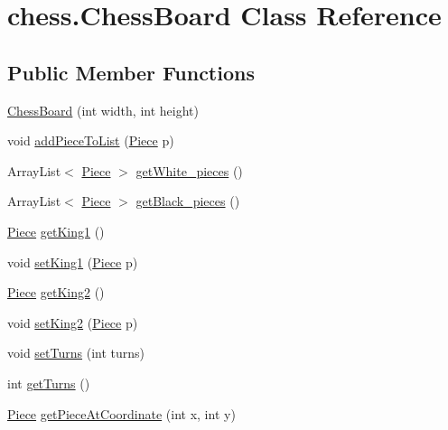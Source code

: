 \hypertarget{classchess_1_1_chess_board}{}\section{chess.\+Chess\+Board Class Reference}
\label{classchess_1_1_chess_board}
\subsection*{Public Member Functions}
\begin{DoxyCompactItemize}
\item 
\hyperlink{classchess_1_1_chess_board_aa5156220e39dfc196616ec027a602901}{Chess\+Board} (int width, int height)
\item 
void \hyperlink{classchess_1_1_chess_board_a10ec830ed5f42a0d269cfd8e7357482b}{add\+Piece\+To\+List} (\hyperlink{classpiece_1_1_piece}{Piece} p)
\item 
Array\+List$<$ \hyperlink{classpiece_1_1_piece}{Piece} $>$ \hyperlink{classchess_1_1_chess_board_a10397175a3ba6a70251604502f62449d}{get\+White\+\_\+pieces} ()
\item 
Array\+List$<$ \hyperlink{classpiece_1_1_piece}{Piece} $>$ \hyperlink{classchess_1_1_chess_board_ac7bc7bbe8fe20fec74bde65be0a85f8b}{get\+Black\+\_\+pieces} ()
\item 
\hyperlink{classpiece_1_1_piece}{Piece} \hyperlink{classchess_1_1_chess_board_a6d3fa6814faec0a97181d11c7c7c38b2}{get\+King1} ()
\item 
void \hyperlink{classchess_1_1_chess_board_a51bb798d92b0db194b07b9ee4911b76d}{set\+King1} (\hyperlink{classpiece_1_1_piece}{Piece} p)
\item 
\hyperlink{classpiece_1_1_piece}{Piece} \hyperlink{classchess_1_1_chess_board_a9ba6bbc41fa21cad31dfc055445c7bdf}{get\+King2} ()
\item 
void \hyperlink{classchess_1_1_chess_board_a313acef6ab77ae8b15ca03c7a9bb7f9a}{set\+King2} (\hyperlink{classpiece_1_1_piece}{Piece} p)
\item 
void \hyperlink{classchess_1_1_chess_board_a6807f49031043b17436bf3c4cb1993e6}{set\+Turns} (int turns)
\item 
int \hyperlink{classchess_1_1_chess_board_ac17fec5fcc2de5cd4084d129648c16fb}{get\+Turns} ()
\item 
\hyperlink{classpiece_1_1_piece}{Piece} \hyperlink{classchess_1_1_chess_board_a9215cfd241796e40b3f4ad8db0fd706f}{get\+Piece\+At\+Coordinate} (int x, int y)
\item 

\end{DoxyCompactItemize}
